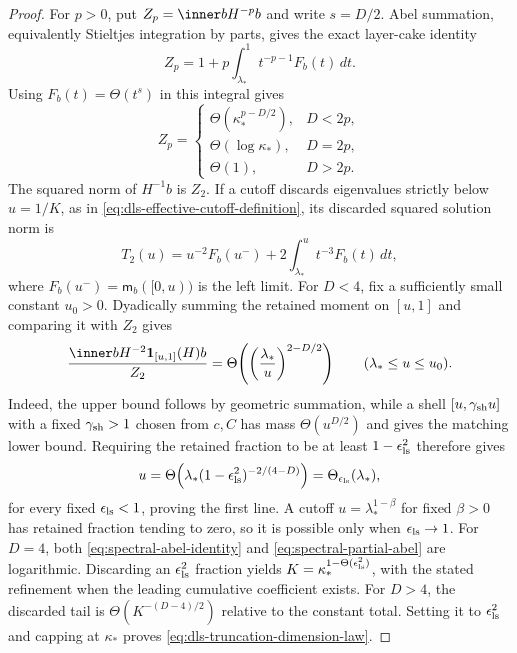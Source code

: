 \begin{proof}
For $p>0$, put $Z_p=\inner b{H^{-p}b}$ and write $s=D/2$.  Abel summation,
equivalently Stieltjes integration by parts, gives the exact layer-cake
identity
\begin{equation}
 Z_p=1+p\int_{\lambda_*}^1 t^{-p-1}F_b(t)\,dt.
 \label{eq:spectral-abel-identity}
\end{equation}
Using $F_b(t)=\Theta(t^s)$ in this integral gives
\begin{equation}
 Z_p=
 \begin{cases}
  \Theta(\kappa_*^{p-D/2}),&D<2p,\\
  \Theta(\log\kappa_*),&D=2p,\\
  \Theta(1),&D>2p.
 \end{cases}
 \label{eq:spectral-moment-law}
\end{equation}
The squared norm of $H^{-1}b$ is $Z_2$.  If a cutoff discards eigenvalues
strictly below $u=1/K$, as in \eqref{eq:dls-effective-cutoff-definition}, its
discarded squared solution norm is
\begin{equation}
 T_2(u)=u^{-2}F_b(u^-)
       +2\int_{\lambda_*}^{u}t^{-3}F_b(t)\,dt,
 \label{eq:spectral-partial-abel}
\end{equation}
where $F_b(u^-)=\mathsf m_b([0,u))$ is the left limit.
For $D<4$, fix a sufficiently small constant $u_0>0$.  Dyadically summing
the retained moment on $[u,1]$ and comparing it with $Z_2$ gives
\begin{equation}
 \frac{\inner b{H^{-2}\mathbf1_{[u,1]}(H)b}}{Z_2}
 =\Theta\!\left(
   \left(\frac{\lambda_*}{u}\right)^{2-D/2}\right)
 \qquad(\lambda_*\leq u\leq u_0).
 \label{eq:subcritical-retained-mass}
\end{equation}
Indeed, the upper bound follows by geometric summation, while a shell
$[u,\gamma_{\rm sh}u]$ with a fixed $\gamma_{\rm sh}>1$ chosen from
$c,C$ has mass $\Theta(u^{D/2})$ and gives the matching
lower bound.  Requiring the
retained fraction to be at least $1-\epsilon_{\rm ls}^2$ therefore gives
\begin{equation}
 u=\Theta\!\left(
 \lambda_*(1-\epsilon_{\rm ls}^2)^{-2/(4-D)}\right)
 =\Theta_{\epsilon_{\rm ls}}(\lambda_*),
 \label{eq:subcritical-cutoff}
\end{equation}
for every fixed $\epsilon_{\rm ls}<1$, proving the first line.  A cutoff
$u=\lambda_*^{1-\beta}$ for fixed $\beta>0$ has retained fraction tending to
zero, so it is
possible only when $\epsilon_{\rm ls}\to1$.  For $D=4$, both
\eqref{eq:spectral-abel-identity} and \eqref{eq:spectral-partial-abel} are
logarithmic.  Discarding an $\epsilon_{\rm ls}^2$ fraction yields
$K=\kappa_*^{1-\Theta(\epsilon_{\rm ls}^2)}$, with the stated refinement when the
leading cumulative coefficient exists.  For $D>4$, the discarded tail is
$\Theta(K^{-(D-4)/2})$ relative to the constant total.  Setting it to
$\epsilon_{\rm ls}^2$ and capping at $\kappa_*$ proves
\eqref{eq:dls-truncation-dimension-law}.


\end{proof}
